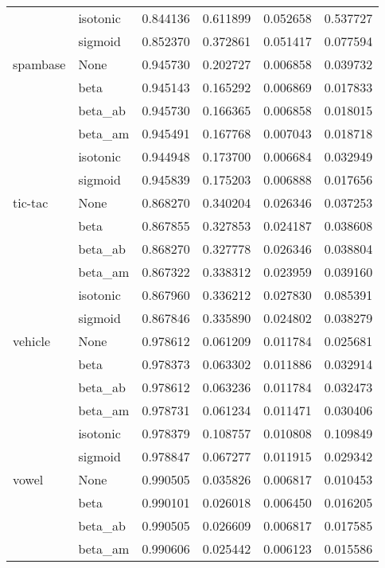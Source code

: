 \begin{tabular}{llrrrr}
        & isotonic &  0.844136 &  0.611899 &  0.052658 &  0.537727 \\
        & sigmoid &  0.852370 &  0.372861 &  0.051417 &  0.077594 \\
spambase & None &  0.945730 &  0.202727 &  0.006858 &  0.039732 \\
        & beta &  0.945143 &  0.165292 &  0.006869 &  0.017833 \\
        & beta\_ab &  0.945730 &  0.166365 &  0.006858 &  0.018015 \\
        & beta\_am &  0.945491 &  0.167768 &  0.007043 &  0.018718 \\
        & isotonic &  0.944948 &  0.173700 &  0.006684 &  0.032949 \\
        & sigmoid &  0.945839 &  0.175203 &  0.006888 &  0.017656 \\
tic-tac & None &  0.868270 &  0.340204 &  0.026346 &  0.037253 \\
        & beta &  0.867855 &  0.327853 &  0.024187 &  0.038608 \\
        & beta\_ab &  0.868270 &  0.327778 &  0.026346 &  0.038804 \\
        & beta\_am &  0.867322 &  0.338312 &  0.023959 &  0.039160 \\
        & isotonic &  0.867960 &  0.336212 &  0.027830 &  0.085391 \\
        & sigmoid &  0.867846 &  0.335890 &  0.024802 &  0.038279 \\
vehicle & None &  0.978612 &  0.061209 &  0.011784 &  0.025681 \\
        & beta &  0.978373 &  0.063302 &  0.011886 &  0.032914 \\
        & beta\_ab &  0.978612 &  0.063236 &  0.011784 &  0.032473 \\
        & beta\_am &  0.978731 &  0.061234 &  0.011471 &  0.030406 \\
        & isotonic &  0.978379 &  0.108757 &  0.010808 &  0.109849 \\
        & sigmoid &  0.978847 &  0.067277 &  0.011915 &  0.029342 \\
vowel & None &  0.990505 &  0.035826 &  0.006817 &  0.010453 \\
        & beta &  0.990101 &  0.026018 &  0.006450 &  0.016205 \\
        & beta\_ab &  0.990505 &  0.026609 &  0.006817 &  0.017585 \\
        & beta\_am &  0.990606 &  0.025442 &  0.006123 &  0.015586 \\

\end{tabular}
